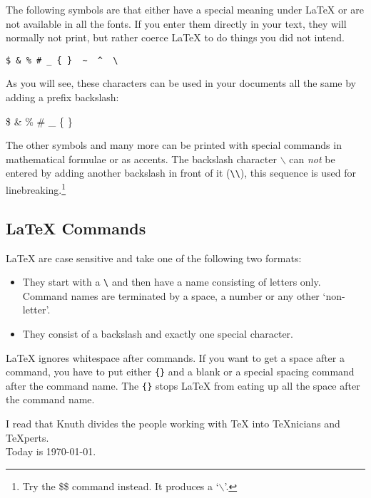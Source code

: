 The following symbols are  that either have a
special meaning under \LaTeX{} or are not available in all the fonts.
If you enter them directly in your text, they will normally not print,
but rather coerce \LaTeX{} to do things you did not intend. 
\begin{code}
\verb.$ & % # _ { }  ~  ^  \ . %
\end{code}

As you will see, these characters can be used in your documents all
the same by adding a prefix backslash:

\begin{example}
\$ \& \% \# \_ \{ \}
\end{example}

The other symbols and many more can be printed with special commands
in mathematical formulae or as accents. The backslash character
$\backslash$ can \emph{not} be entered by adding another backslash
in front of it (\verb|\\|), this sequence is used for
linebreaking.\footnote{Try the \$\$ command instead. It
  produces a `$\backslash$'.}

\subsection{\LaTeX{} Commands}

\LaTeX{}  are case sensitive and take one of the following
two formats:

\begin{itemize}
\item They start with a  \verb|\| and then have a name
 consisting of letters only. Command names are terminated by a
 space, a number or any other `non-letter'.
\item They consist of a backslash and exactly one %
 special character.
\end{itemize}

%
%

%
%

\LaTeX{} ignores whitespace after commands. If you want to get a
space after a command, you have to
put either \verb|{}| and a blank or a special spacing command after the
command name. The \verb|{}| stops \LaTeX{} from eating up all the space after
the command name. 

\begin{example}
I read that Knuth divides the 
people working with \TeX{} into 
\TeX{}nicians and \TeX perts.\\
Today is \today.
\end{example}

